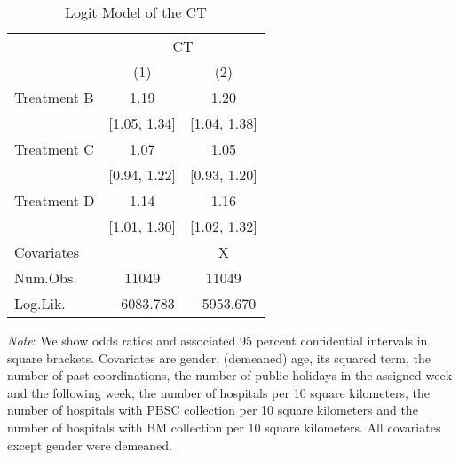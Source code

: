 \documentclass[12pt, a4paper]{article}
\begin{document}
\begin{table}[H]

\caption{\label{tab:logit-test}Logit Model of the CT}
\centering
\fontsize{8}{10}\selectfont
\begin{threeparttable}
\begin{tabular}[t]{>{\raggedright\arraybackslash}p{20em}cc}
\toprule
\multicolumn{1}{c}{ } & \multicolumn{2}{c}{CT} \\
\cmidrule(l{3pt}r{3pt}){2-3}
  & (1) & (2)\\
\midrule
Treatment B & \num{1.19} & \num{1.20}\\
 & {}[\num{1.05}, \num{1.34}] & {}[\num{1.04}, \num{1.38}]\\
Treatment C & \num{1.07} & \num{1.05}\\
 & {}[\num{0.94}, \num{1.22}] & {}[\num{0.93}, \num{1.20}]\\
Treatment D & \num{1.14} & \num{1.16}\\
 & {}[\num{1.01}, \num{1.30}] & {}[\num{1.02}, \num{1.32}]\\
\midrule
Covariates &  & X\\
Num.Obs. & \num{11049} & \num{11049}\\
Log.Lik. & \num{-6083.783} & \num{-5953.670}\\
\bottomrule
\end{tabular}
\begin{tablenotes}
\item \emph{Note}: We show odds ratios and associated 95 percent confidential intervals in square brackets. Covariates are gender, (demeaned) age, its squared term, the number of past coordinations, the number of public holidays in the assigned week and the following week, the number of hospitals per 10 square kilometers, the number of hospitals with PBSC collection per 10 square kilometers and the number of hospitals with BM collection per 10 square kilometers. All covariates except gender were demeaned.
\end{tablenotes}
\end{threeparttable}
\end{table}
\end{document}

